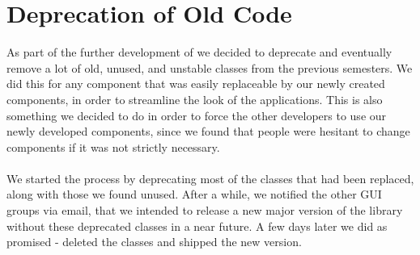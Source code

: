 
\section{Deprecation of Old Code}
\label{sec:deprecation_of_old_code}

As part of the further development of \gc we decided to deprecate and eventually remove a lot of old, unused, and unstable classes from the previous semesters. 
We did this for any component that was easily replaceable by our newly created components, in order to streamline the look of the applications.
This is also something we decided to do in order to force the other developers to use our newly developed components, since we found that people were hesitant to change components if it was not strictly necessary. 
\\\\
We started the process by deprecating most of the classes that had been replaced, along with those we found unused. After a while, we notified the other GUI groups via email, that we intended to release a new major version of the \gc library without these deprecated classes in a near future. A few days later we did as promised - deleted the classes and shipped the new version.
